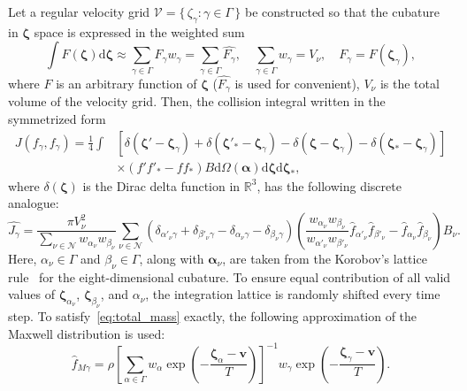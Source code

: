 \documentclass[review]{elsarticle}
\newcommand{\dd}{\mathrm{d}}
\newcommand{\dzeta}{\boldsymbol{\dd\zeta}}
\newcommand{\bzeta}{\boldsymbol{\zeta}}
\newcommand{\Nu}{\mathcal{N}}
\newcommand{\Set}[2]{\{\,{#1}:{#2}\,\}}
\begin{document}
Let a regular velocity grid \(\mathcal{V} = \Set{\zeta_\gamma}{\gamma\in\Gamma}\) be constructed so that
the cubature in \(\bzeta\) space is expressed in the weighted sum
\begin{equation}\label{eq:zeta_cubature}
    \int F(\bzeta) \dzeta \approx \sum_{\gamma\in\Gamma} F_\gamma w_\gamma
        = \sum_{\gamma\in\Gamma} \hat{F_\gamma},
        \quad \sum_{\gamma\in\Gamma} w_\gamma = V_\nu,
        \quad F_\gamma = F(\bzeta_\gamma),
\end{equation}
where \(F\) is an arbitrary function of \(\bzeta\) (\(\hat{F_\gamma}\) is used for convenient),
\(V_\nu\) is the total volume of the velocity grid.
Then, the collision integral written in the symmetrized form
\begin{equation}\label{eq:symm_ci}
    \begin{aligned}
    J(f_\gamma, f_\gamma) = \frac14\int &\left[
        \delta(\bzeta'-\bzeta_\gamma) + \delta(\bzeta'_*-\bzeta_\gamma)
        - \delta(\bzeta-\bzeta_\gamma) - \delta(\bzeta_*-\bzeta_\gamma)\right] \\
        &\times(f'f'_* - ff_*)B \dd\Omega(\boldsymbol{\alpha}) \dzeta\dzeta_*,
    \end{aligned}
\end{equation}
where \(\delta(\bzeta)\) is the Dirac delta function in \(\mathbb{R}^3\),
has the following discrete analogue:
\begin{equation}\label{eq:discrete_symm_ci}
    \hat{J_\gamma} = \frac{\pi V_\nu^2}{\sum_{\nu\in\Nu} w_{\alpha_\nu}w_{\beta_\nu}}
        \sum_{\nu\in\Nu} \left(
            \delta_{\alpha'_\nu\gamma} + \delta_{\beta'_\nu\gamma}
            - \delta_{\alpha_\nu\gamma} - \delta_{\beta_\nu\gamma}
        \right)\left(
            \frac{w_{\alpha_\nu}w_{\beta_\nu}}{w_{\alpha'_\nu}w_{\beta'_\nu}}
            \hat{f}_{\alpha'_\nu}\hat{f}_{\beta'_\nu} - \hat{f}_{\alpha_\nu}\hat{f}_{\beta_\nu}
        \right)B_\nu.
\end{equation}
Here, \(\alpha_\nu\in\Gamma\) and \(\beta_\nu\in\Gamma\), along with \(\boldsymbol{\alpha}_\nu\),
are taken from the Korobov's lattice rule~\citep{Korobov1959, Sloan1994}
for the eight-dimensional cubature.
To ensure equal contribution of all valid values of
\(\bzeta_{\alpha_\nu}\), \(\bzeta_{\beta_\nu}\), and \(\alpha_\nu\),
the integration lattice is randomly shifted every time step.
To satisfy~\eqref{eq:total_mass} exactly, the following approximation of the Maxwell distribution is used:
\begin{equation}\label{eq:discrete_Maxwell}
    \hat{f}_{M\gamma} = \rho\left[\sum_{\alpha\in\Gamma}w_\alpha\exp
            \left(-\frac{\bzeta_\alpha - \boldsymbol{v}}{T}\right)
        \right]^{-1}
        w_\gamma\exp\left(-\frac{\bzeta_\gamma - \boldsymbol{v}}{T}\right).
\end{equation}
\end{document}
